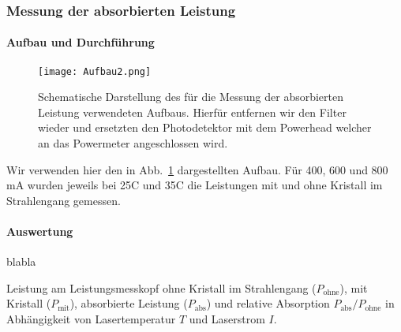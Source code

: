 \subsubsection{Messung der absorbierten Leistung}

\paragraph{Aufbau und Durchführung}

\begin{figure}[H]
\begin{center}
  \texttt{[image: Aufbau2.png]}
  \caption{Schematische Darstellung des für die Messung der absorbierten Leistung verwendeten Aufbaus. Hierfür entfernen wir den Filter wieder und ersetzten den Photodetektor mit dem Powerhead welcher an das Powermeter angeschlossen wird.}
  \label{img:aufbau2}
\end{center}
\end{figure}

Wir verwenden hier den in Abb.~\ref{img:aufbau2} dargestellten Aufbau. Für 400, 600 und 800\,mA wurden jeweils bei 25\grad C und 35\grad C die Leistungen mit und ohne Kristall im Strahlengang gemessen.



\paragraph{Auswertung}
blabla
 
\begin{table}[htb]
\caption{Leistung am Leistungsmesskopf ohne Kristall im Strahlengang ($P_\text{ohne}$),
mit Kristall ($P_\text{mit}$), absorbierte Leistung ($P_\text{abs}$) und relative Absorption
$P_\text{abs}/P_\text{ohne}$ in Abhängigkeit von Lasertemperatur $T$ und Laserstrom $I$.}

\label{tab:Absorption}
\end{table}
